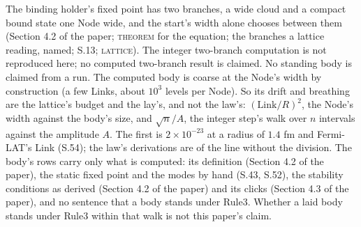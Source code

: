 \documentclass[pdflatex,sn-mathphys-num]{sn-jnl}
\newcommand{\claimmark}[1]{\textup{\textsc{#1}}}
\newcommand{\fence}[1]{\textup{\textsc{#1}}}
\theoremstyle{thmstyleone}
\begin{document}
The binding holder's fixed point has two branches, a wide cloud and a compact bound state one Node wide, and the start's width alone chooses between them (Section 4.2 of the paper; \claimmark{theorem} for the equation; the branches a lattice reading, named; S.13; \fence{lattice}). The integer two-branch computation is not reproduced here; no computed two-branch result is claimed. No standing body is claimed from a run. The computed body is coarse at the Node's width by construction (a few Links, about $10^3$ levels per Node). So its drift and breathing are the lattice's budget and the lay's, and not the law's: $(\mathrm{Link} / R)^2$, the Node's width against the body's size, and $\sqrt n / A$, the integer step's walk over $n$ intervals against the amplitude $A$. The first is $2 \times 10^{-23}$ at a radius of $1.4$ fm and Fermi-LAT's Link (S.54); the law's derivations are of the line without the division. The body's rows carry only what is computed: its definition (Section 4.2 of the paper), the static fixed point and the modes by hand (S.43, S.52), the stability conditions as derived (Section 4.2 of the paper) and its clicks (Section 4.3 of the paper), and no sentence that a body stands under Rule3. Whether a laid body stands under Rule3 within that walk is not this paper's claim.
\end{document}
